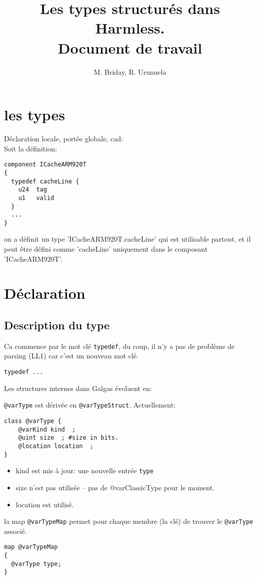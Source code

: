 \documentclass[11pt]{article}
\title{Les types structurés dans Harmless. \\ Document de travail}
\author{M. Briday, R. Urunuela}
\begin{document}
\maketitle
\tableofcontents
\maketitle
\section{les types}
Déclaration locale, portée globale, cad: \\
Soit la définition:
\begin{lstlisting}
component ICacheARM920T
{
  typedef cacheLine {
    u24  tag
    u1   valid
  }
  ...
}
\end{lstlisting}

on a définit un type 'ICacheARM920T.cacheLine' qui est utilisable partout, et il peut être défini comme 'cacheLine' uniquement dans le composant 'ICacheARM920T'.

\section{Déclaration}
\subsection{Description du type}
Ca commence par le mot clé \texttt{typedef}, du coup, il n'y a pas de problème de parsing (LL1) car c'est un nouveau mot clé.
\begin{lstlisting}
typedef ...
\end{lstlisting}

Les structures internes dans Galgas évoluent en:

\texttt{@varType} est dérivée en \texttt{@varTypeStruct}. Actuellement:
\begin{verbatim}
class @varType {
    @varKind kind  ;
    @uint size  ; #size in bits.
    @location location  ;
}
\end{verbatim}
\begin{itemize}
\item kind est mis à jour: une nouvelle entrée \texttt{type}
\item size n'est pas utilisée -- pas de @varClassicType pour le moment.
\item location est utilisé.
\end{itemize}

la map \texttt{@varTypeMap} permet pour chaque membre (la clé) de trouver le \texttt{@varType} associé.
\begin{verbatim}
map @varTypeMap
{
  @varType type;
}
\end{verbatim}
\end{document}
